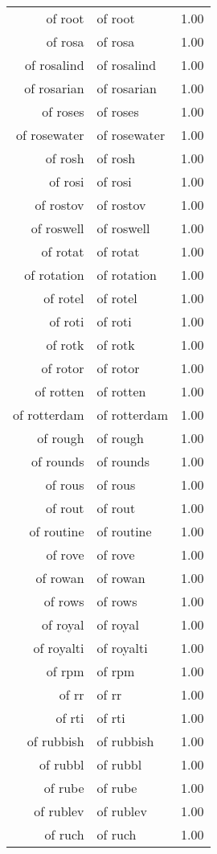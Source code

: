 \begin{table}[ht]
\begin{tabular}{rlr}
  of root & of root & 1.00 \\ 
  of rosa & of rosa & 1.00 \\ 
  of rosalind & of rosalind & 1.00 \\ 
  of rosarian & of rosarian & 1.00 \\ 
  of roses & of roses & 1.00 \\ 
  of rosewater & of rosewater & 1.00 \\ 
  of rosh & of rosh & 1.00 \\ 
  of rosi & of rosi & 1.00 \\ 
  of rostov & of rostov & 1.00 \\ 
  of roswell & of roswell & 1.00 \\ 
  of rotat & of rotat & 1.00 \\ 
  of rotation & of rotation & 1.00 \\ 
  of rotel & of rotel & 1.00 \\ 
  of roti & of roti & 1.00 \\ 
  of rotk & of rotk & 1.00 \\ 
  of rotor & of rotor & 1.00 \\ 
  of rotten & of rotten & 1.00 \\ 
  of rotterdam & of rotterdam & 1.00 \\ 
  of rough & of rough & 1.00 \\ 
  of rounds & of rounds & 1.00 \\ 
  of rous & of rous & 1.00 \\ 
  of rout & of rout & 1.00 \\ 
  of routine & of routine & 1.00 \\ 
  of rove & of rove & 1.00 \\ 
  of rowan & of rowan & 1.00 \\ 
  of rows & of rows & 1.00 \\ 
  of royal & of royal & 1.00 \\ 
  of royalti & of royalti & 1.00 \\ 
  of rpm & of rpm & 1.00 \\ 
  of rr & of rr & 1.00 \\ 
  of rti & of rti & 1.00 \\ 
  of rubbish & of rubbish & 1.00 \\ 
  of rubbl & of rubbl & 1.00 \\ 
  of rube & of rube & 1.00 \\ 
  of rublev & of rublev & 1.00 \\ 
  of ruch & of ruch & 1.00 \\ 

\end{tabular}
\end{table}
